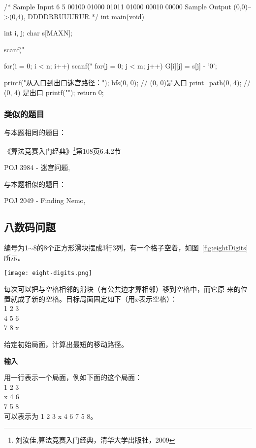 \begin{Codex}[label=maze.c]
/*
Sample Input
6 5
00100
01000
01011
01000
00010
00000
Sample Output
(0,0)-->(0,4), DDDDRRUUURUR
*/
int main(void) {
    int i, j;
    char s[MAXN];

    scanf("%

    for(i = 0; i < n; i++) {
        scanf("%
        for(j = 0; j < m; j++) {
            G[i][j] = s[j] - '0';
        }
    }

    printf("从入口到出口迷宫路径：\n");
    bfs(0, 0);	// (0, 0)是入口
    print_path(0, 4); // (0, 4) 是出口
    printf("\n");
    return 0;
}
\end{Codex}

\subsubsection{类似的题目}
与本题相同的题目：
\begindot
\item 《算法竞赛入门经典》\footnote{刘汝佳,算法竞赛入门经典，清华大学出版社，2009}第108页6.4.2节
\item  POJ 3984 - 迷宫问题, 
\myenddot

与本题相似的题目：
\begindot
\item  POJ 2049 - Finding Nemo, 
\myenddot

\subsection{八数码问题}
\label{subsec:eightDigits}
编号为1$\sim$8的8个正方形滑块摆成3行3列，有一个格子空着，如图~\ref{fig:eightDigits}所示。

\begin{center}
\texttt{[image: eight-digits.png]}\\
\label{fig:eightDigits}
\end{center}

每次可以把与空格相邻的滑块（有公共边才算相邻）移到空格中，而它原
来的位置就成了新的空格。目标局面固定如下（用$x$表示空格）：\\
1 2 3 \\
4 5 6 \\
7 8 x

给定初始局面，计算出最短的移动路径。

\textbf{输入}

用一行表示一个局面，例如下面的这个局面： \\
 1  2  3 \\
 x  4  6 \\
 7  5  8 \\
可以表示为 1 2 3 x 4 6 7 5 8。 

